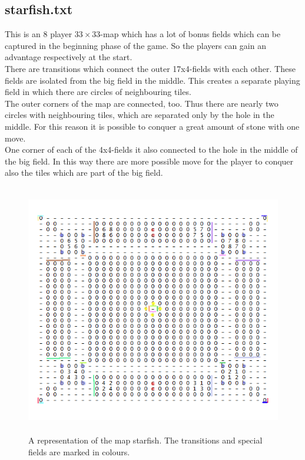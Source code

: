 \documentclass[a4paper,12pt]{article}
\begin{document}
\subsection{starfish.txt}
This is an 8 player $33\times33$-map which has a lot of bonus fields which can be captured in the beginning phase of the game. So the players can gain an advantage respectively at the start. \\
There are transitions which connect the outer 17x4-fields with each other. These fields are isolated from the big field in the middle. This creates a separate playing field in which there are circles of neighbouring tiles. \\  
The outer corners of the map are connected, too. Thus there are nearly two circles with neighbouring tiles, which are separated only by the hole in the middle. For this reason it is possible to conquer a great amount of stone with one move.\\
One corner of each of the 4x4-fields it also connected to the hole in the middle of the big field. In this way there are more possible move for the player to conquer also the tiles which are part of the big field.
\begin{figure}[H]
    \centering
    \includegraphics[height=11cm]{pictures/assignment1/starfish.PNG}
    \caption{A representation of the map starfish. The transitions and special fields are marked in colours.}
    \label{fig:starfish}
\end{figure}
\end{document}
